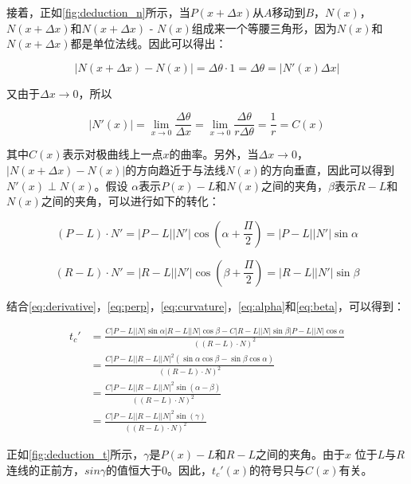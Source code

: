 接着，正如\autoref{fig:deduction_n}所示，当$P(x+\Delta x)$从$A$移动到$B$，$N(x)$，$N(x+\Delta x)$和$N(x+\Delta x)$ - $N(x)$组成来一个等腰三角形，因为$N(x)$和$N(x+\Delta x)$都是单位法线。因此可以得出：

\begin{equation}
    |N(x+\Delta x) - N(x)| = \Delta\theta \cdot 1 = \Delta\theta = |N'(x)\Delta x|
\end{equation}

又由于$\Delta x \to 0$，所以

\begin{equation}\label{eq:curvature}
    |N'(x)| = \lim_{x \to 0}\frac{\Delta\theta}{\Delta x} = \lim_{x \to 0}\frac{\Delta\theta}{r\Delta\theta} = \frac{1}{r} = C(x)
\end{equation}

其中$C(x)$表示对极曲线上一点$x$的曲率。另外，当$\Delta x \to 0$，$|N(x+\Delta x) - N(x)|$的方向趋近于与法线$N(x)$的方向垂直，因此可以得到$N'(x) \perp N(x)$。假设 $\alpha$表示$P(x)-L$和$N(x)$之间的夹角，$\beta$表示$R-L$和$N(x)$之间的夹角，可以进行如下的转化：

\begin{equation}\label{eq:alpha}
(P-L)\cdot{N'} = |P-L|{|N'|}\cos{(\alpha+\frac{\Pi}{2})} = |P-L|{|N'|}\sin\alpha
\end{equation}

\begin{equation}\label{eq:beta}
(R-L)\cdot{N'} = |R-L|{|N'|}\cos{(\beta+\frac{\Pi}{2})} = |R-L|{|N'|}\sin\beta
\end{equation}

结合\autoref{eq:derivative}，\autoref{eq:perp}，\autoref{eq:curvature}，\autoref{eq:alpha}和\ref{eq:beta}，可以得到：

\begin{equation}\label{eq:final}
\begin{split}
t_c' & = \frac{C|P-L||N|\sin\alpha|R-L||N|\cos\beta-C|R-L||N|\sin\beta|P-L||N|\cos\alpha}{((R-L)\cdot{N})^2} \\
& = \frac{C|P-L||R-L||N|^2(\sin\alpha\cos\beta-\sin\beta\cos\alpha)}{((R-L)\cdot{N})^2} \\
& = \frac{C|P-L||R-L||N|^2\sin(\alpha-\beta)}{((R-L)\cdot{N})^2} \\
& = \frac{C|P-L||R-L||N|^2\sin(\gamma)}{((R-L)\cdot{N})^2}
\end{split}
\end{equation}

正如\autoref{fig:deduction_t}所示，$\gamma$是$P(x)-L$和$R-L$之间的夹角。由于$x$ 位于$L$与$R$连线的正前方，$sin\gamma$的值恒大于0。因此，$t_c'(x)$的符号只与$C(x)$有关。

